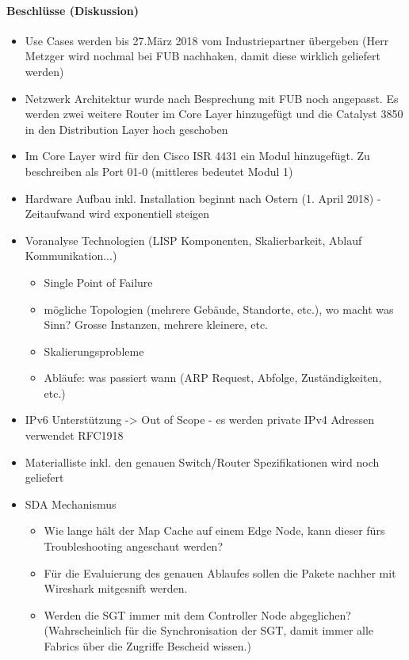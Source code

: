 \paragraph{Beschlüsse (Diskussion)}
\begin{itemize}	
	\item Use Cases werden bis 27.März 2018 vom Industriepartner übergeben (Herr Metzger wird nochmal bei FUB nachhaken, damit diese wirklich geliefert werden)
	\item Netzwerk Architektur wurde nach Besprechung mit FUB noch angepasst. Es werden zwei weitere Router im Core Layer hinzugefügt und die Catalyst 3850 in den Distribution Layer hoch geschoben
	\item Im Core Layer wird für den Cisco ISR 4431 ein Modul hinzugefügt. Zu beschreiben als Port 01-0 (mittleres bedeutet Modul 1)
	\item Hardware Aufbau inkl. Installation beginnt nach Ostern (1. April 2018) - Zeitaufwand wird exponentiell steigen
	\item Voranalyse Technologien (LISP Komponenten, Skalierbarkeit, Ablauf Kommunikation...)
	\begin{itemize}
		\item Single Point of Failure
		\item mögliche Topologien (mehrere Gebäude, Standorte, etc.), wo macht was Sinn? Grosse Instanzen, mehrere kleinere, etc.
		\item Skalierungsprobleme
		\item Abläufe: was passiert wann (ARP Request, Abfolge, Zuständigkeiten, etc.)
	\end{itemize}
	\item IPv6 Unterstützung -> Out of Scope - es werden private IPv4 Adressen verwendet RFC1918
	\item Materialliste inkl. den genauen Switch/Router Spezifikationen wird noch geliefert
	\item SDA Mechanismus
	\begin{itemize}
		\item Wie lange hält der Map Cache auf einem Edge Node, kann dieser fürs Troubleshooting angeschaut werden?
		\item Für die Evaluierung des genauen Ablaufes sollen die Pakete nachher mit Wireshark mitgesnift werden.
		\item Werden die SGT immer mit dem Controller Node abgeglichen? (Wahrscheinlich für die Synchronisation der SGT, damit immer alle Fabrics über die Zugriffe Bescheid wissen.)
	\end{itemize}
\end{itemize}

